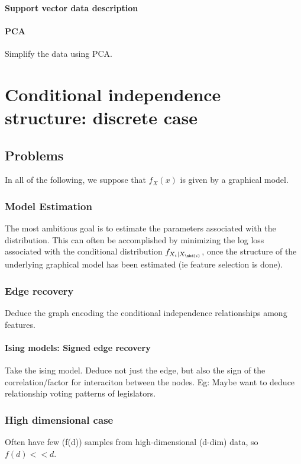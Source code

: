 \documentclass[oneside, article]{memoir}
\begin{document}
\subsubsection{Support vector data description}
\tbc

\subsubsection{PCA}
Simplify the data using PCA. \tbc


\chapter{Conditional independence structure: discrete case}
\section{Problems}
In all of the following, we suppose that $f_X(x)$ is given by a graphical model.

\subsection{Model Estimation}
The most ambitious goal is to estimate the parameters associated with the distribution. This can often be accomplished by minimizing the log loss associated with the conditional distribution $f_{X_i|X_{\nbd(i)}}$, once the structure of the underlying graphical model has been estimated (ie feature selection is done).

\subsection{Edge recovery}
Deduce the graph encoding the conditional independence relationships among features.

\subsubsection{Ising models: Signed edge recovery}
Take the ising model. Deduce not just the edge, but also the sign of the correlation/factor for interaciton between the nodes. Eg: Maybe want to deduce relationship voting patterns of legislators.

\subsection{High dimensional case}
Often have few (f(d)) samples from high-dimensional (d-dim) data, so $f(d) << d$.
\end{document}
